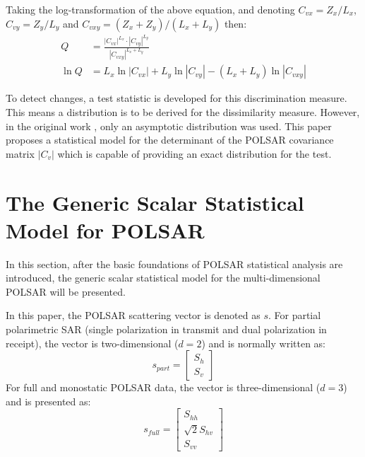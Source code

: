 \documentclass[journal]{IEEEtran}
\begin{document}
Taking the log-transformation of the above equation, and denoting $C_{vx} = Z_x / L_x$, $C_{vy} = Z_y / L_y$ and $C_{vxy} = (Z_x + Z_y)/(L_x + L_y)$ then:
{\small
\begin{align}
  Q &= \frac{|C_{vx}|^{L_x} \cdot |C_{vy}|^{L_y} }{|C_{vxy}|^{L_x + L_y}} \label{eqn:ori_likelyhood_stats} \\
  \ln Q &= L_x \ln |C_{vx}| + L_y \ln |C_{vy}| - (L_x + L_y) \ln |C_{vxy}| \label{eqn:log_likelyhood_stats}
\end{align}
}

To detect changes, a test statistic is developed for this discrimination measure.
This means a distribution is to be derived for the dissimilarity measure.
However, in the original work \cite{Conradsen_2003_TGRS_4}, only an asymptotic distribution was used.
This paper proposes a statistical model for the determinant of the POLSAR covariance matrix $|C_v|$
  which is capable of providing an exact distribution for the test.

\section{The Generic Scalar Statistical Model for POLSAR}  
\label{sec:theoretical_model}

In this section, after the basic foundations of POLSAR statistical analysis are introduced,
  the generic scalar statistical model for the multi-dimensional POLSAR will be presented.

In this paper, the POLSAR scattering vector is denoted as $s$.
For partial polarimetric SAR (single polarization in transmit and dual polarization in receipt),
  the vector is two-dimensional ($d=2$) and is normally written as: 
\begin{equation}
s_{part}=\begin{bmatrix}
S_h\\ 
S_v
\end{bmatrix}
\end{equation}
For full and monostatic POLSAR data,
  the vector is three-dimensional ($d=3$) and is presented as:
\begin{equation}
s_{full}=\begin{bmatrix}
S_{hh}\\
\sqrt{2}S_{hv}\\
S_{vv}
\end{bmatrix}
\end{equation}
\end{document}
